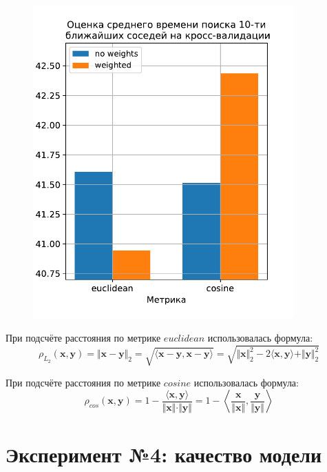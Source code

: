\documentclass[12pt]{article}
\begin{document}
\begin{figure}[h]
\begin{center}
    \includegraphics[width=10cm]{23_cv_time.pdf}
    \caption{}
    \label{fig:23_cv_time}
\end{center}
\end{figure}


При подсчёте расстояния по метрике $euclidean$ использовалась формула:
\begin{equation}
    \rho_{\scriptscriptstyle{L_2}}(\mathbf{x},\mathbf{y}) = \Vert{\mathbf{x} - \mathbf{y}}\Vert_2 = \sqrt{\langle\mathbf{x} - \mathbf{y}, \mathbf{x} - \mathbf{y}\rangle} = \sqrt{\Vert{\mathbf{x}}\Vert_2^2 - 2\langle\mathbf{x}, \mathbf{y}\rangle + \Vert{\mathbf{y}}\Vert_2^2}
\end{equation}

При подсчёте расстояния по метрике $cosine$ использовалась формула:
\begin{equation}
    \rho_{\scriptscriptstyle{cos}}(\mathbf{x},\mathbf{y}) = 1-\frac{\langle\mathbf{x}, \mathbf{y}\rangle}
    {\Vert{\mathbf{x}}\Vert \cdot \Vert{\mathbf{y}}\Vert} = 
    1-\left\langle
        \frac{\mathbf{x}}{\Vert{\mathbf{x}}\Vert},
        \frac{\mathbf{y}}{\Vert{\mathbf{y}}\Vert}
    \right\rangle
\end{equation}

\section{Эксперимент №4: качество модели}
\end{document}
